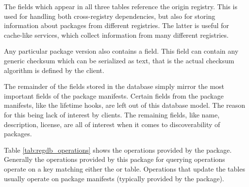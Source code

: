 The  fields which appear in all three tables reference the origin
registry. This is used for handling both cross-registry dependencies, but also
for storing information about packages from different registries. The latter is
useful for cache-like services, which collect information from many different
registries.

Any particular package version also contains a  field. This
field can contain any generic checksum which can be serialized as text, that is
the actual checksum algorithm is defined by the client.

The remainder of the fields stored in the database simply mirror the most
important fields of the package manifests. Certain fields from the package
manifests, like the lifetime hooks, are left out of this database model. The
reason for this being lack of interest by clients. The remaining fields, like
name, description, license, are all of interest when it comes to
discoverability of packages.

Table \ref{tab:regdb_operations} shows the operations provided by the \regdb
package. Generally the operations provided by this package for querying
operations operate on a key matching either the  or
 table. Operations that update the tables usually
operate on package manifests (typically provided by the 
package).

